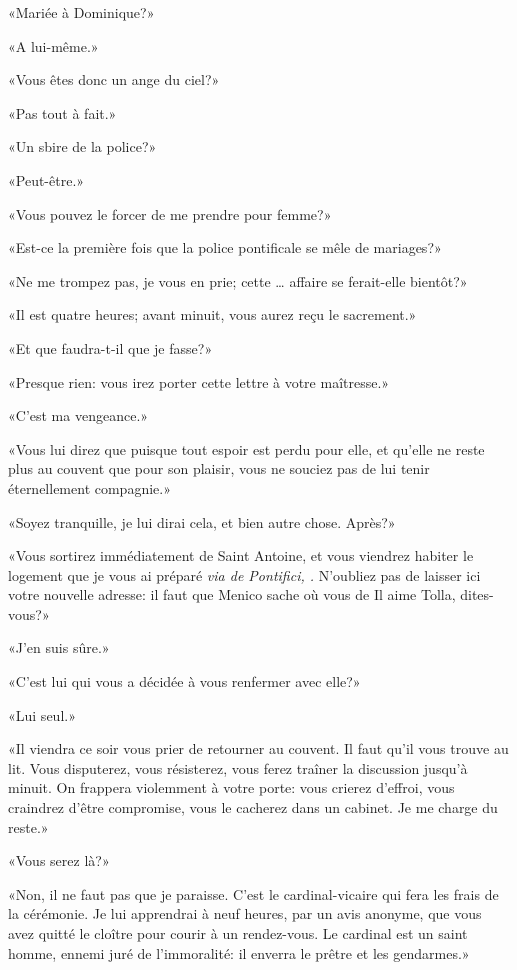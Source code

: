 «Mariée à Dominique?»

«A lui-même.»

«Vous êtes donc un ange du ciel?»

«Pas tout à fait.»

«Un sbire de la police?»

«Peut-être.»

«Vous pouvez le forcer de me prendre pour femme?»

«Est-ce la première fois que la police pontificale se mêle de mariages?»

«Ne me trompez pas, je vous en prie; cette \ldots{} affaire se ferait-elle bientôt?»

«Il est quatre heures; avant minuit, vous aurez reçu le sacrement.»

«Et que faudra-t-il que je fasse?»

«Presque rien: vous irez porter cette lettre à votre maîtresse.»

«C'est ma vengeance.»

«Vous lui direz que puisque tout espoir est perdu pour elle, et qu'elle ne reste plus au couvent que pour son plaisir, vous ne souciez pas de lui tenir éternellement compagnie.»

«Soyez tranquille, je lui dirai cela, et bien autre chose. Après?»

«Vous sortirez immédiatement de Saint Antoine, et vous viendrez habiter le logement que je vous ai préparé \emph{via de Pontifici, .} N'oubliez pas de laisser ici votre nouvelle adresse: il faut que Menico sache où vous de Il aime Tolla, dites-vous?»

«J'en suis sûre.»

«C'est lui qui vous a décidée à vous renfermer avec elle?»

«Lui seul.»

«Il viendra ce soir vous prier de retourner au couvent. Il faut qu'il vous trouve au lit. Vous disputerez, vous résisterez, vous ferez traîner la discussion jusqu'à minuit. On frappera violemment à votre porte: vous crierez d'effroi, vous craindrez d'être compromise, vous le cacherez dans un cabinet. Je me charge du reste.»

«Vous serez là?»

«Non, il ne faut pas que je paraisse. C'est le cardinal-vicaire qui fera les frais de la cérémonie. Je lui apprendrai à neuf heures, par un avis anonyme, que vous avez quitté le cloître pour courir à un rendez-vous. Le cardinal est un saint homme, ennemi juré de l'immoralité: il enverra le prêtre et les gendarmes.»

